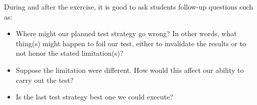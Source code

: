 During and after the exercise, it is good to ask students follow-up questions such as:

\begin{itemize}
\item{} Where might our planned test strategy go wrong?  In other words, what thing(s) might happen to foil our test, either to invalidate the results or to not honor the stated limitation(s)?
\item{} Suppose the limitation were different.  How would this affect our ability to carry out the test?
\item{} Is the last test strategy best one we could execute?
\end{itemize}





